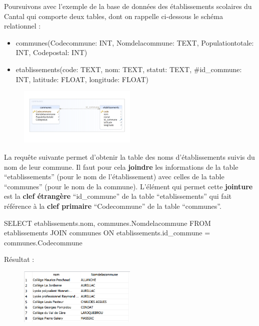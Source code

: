 \documentclass[
  letterpaper,
  DIV=11,
  numbers=noendperiod]{scrartcl}
\newenvironment{Shaded}{\begin{snugshade}}{\end{snugshade}}
\newcommand{\KeywordTok}[1]{\textcolor[rgb]{0.00,0.23,0.31}{#1}}
\newcommand{\NormalTok}[1]{\textcolor[rgb]{0.00,0.23,0.31}{#1}}
\newcommand{\OperatorTok}[1]{\textcolor[rgb]{0.37,0.37,0.37}{#1}}
\providecommand{\tightlist}{%
  \setlength{\itemsep}{0pt}\setlength{\parskip}{0pt}}\usepackage{longtable,booktabs,array}
\begin{document}
Poursuivons avec l'exemple de la base de données des établissements
scolaires du Cantal qui comporte deux tables, dont on rappelle
ci-dessous le schéma relationnel :

\begin{itemize}
\tightlist
\item
  communes({Codecommune}: INT, Nomdelacommune: TEXT, Populationtotale:
  INT, Codepostal: INT)
\item
  etablissements({code}: TEXT, nom: TEXT, statut: TEXT, \#id\_commune:
  INT, latitude: FLOAT, longitude: FLOAT)
\end{itemize}

\begin{figure}

{\centering \includegraphics[width=0.5\textwidth,height=\textheight]{BDD11.png}

}

\end{figure}

La requête suivante permet d'obtenir la table des noms d'établissements
suivis du nom de leur commune. Il faut pour cela \textbf{joindre} les
informations de la table ``etablissements'' (pour le nom de
l'établissement) avec celles de la table ``communes'' (pour le nom de la
commune). L'élément qui permet cette \textbf{jointure} est la
\textbf{clef étrangère} ``id\_commune'' de la table ``etablissements''
qui fait référence à la \textbf{clef primaire} ``Codecommune'' de la
table ``communes''.

\begin{Shaded}
\begin{Highlighting}[]
\KeywordTok{SELECT}\NormalTok{ etablissements.nom, communes.Nomdelacommune }
\KeywordTok{FROM}\NormalTok{ etablissements }\KeywordTok{JOIN}\NormalTok{ communes }
\KeywordTok{ON}\NormalTok{ etablissements.id\_commune }\OperatorTok{=}\NormalTok{ communes.Codecommune}
\end{Highlighting}
\end{Shaded}

Résultat :

\begin{figure}

{\centering \includegraphics[width=0.5\textwidth,height=\textheight]{SQL9.png}

}

\end{figure}
\end{document}
